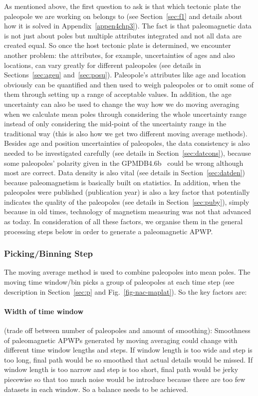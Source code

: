 As mentioned above, the first question to ask is that which tectonic plate the
paleopole we are working on belongs to (see Section~\ref{sec:f1} and details
about how it is solved in Appendix~\ref{appen4chp3}). The fact is that
paleomagnetic data is not just about poles but multiple attributes integrated
and not all data are created equal. So once the host tectonic plate is
determined, we encounter another problem: the attributes, for example,
uncertainties of ages and also locations, can vary greatly for different
paleopoles (see details in Sections~\ref{sec:ageu} and~\ref{sec:posu}).
Paleopole's attributes like age and location obviously can be
quantified and then used to weigh paleopoles or to omit some of them through
setting up a range of acceptable values. In addition, the age uncertainty can
also be used to change the way how we do moving averaging when we calculate mean
poles through considering the whole uncertainty range instead of only
considering the mid-point of the uncertainty range in the traditional way (this
is also how we get two different moving average methods). Besides age and
position uncertainties of paleopoles, the data consistency is also needed to be
investigated carefully (see details in Section~\ref{sec:datcons}), because some
paleopoles' polarity given in the GPMDB4.6b~\cite[updated in 2016 by the Ivar
Giaever Geomagnetic Laboratory team, in collaboration with Pisarevsky]{M96,P05}
could be wrong although most are correct. Data density is also vital (see
details in Section~\ref{sec:datden}) because paleomagnetism is basically built
on statistics. In addition, when the paleopoles were published (publication
year) is also a key factor that potentially indicates the quality of the
paleopoles (see details in Section~\ref{sec:puby}), simply because in old times,
technology of magnetism measuring was not that advanced as today. In
consideration of all these factors, we organise them in the general processing
steps below in order to generate a paleomagnetic APWP\@.

\subsubsection{Picking/Binning Step}

The moving average method is used to combine paleopoles into mean poles. The
moving time window/bin picks a group of paleopoles at each time step (see
description in Section~\ref{sec:p} and Fig.~\ref{fig-nac-maplat}). So the key
factors are:

\paragraph{Width of time window}
(trade off between number of paleopoles and amount of smoothing): Smoothness of
paleomagnetic APWPs generated by moving averaging could change with different
time window lengths and steps. If window length is too wide and step is too
long, final path would be so smoothed that actual details would be missed. If
window length is too narrow and step is too short, final path would be jerky
piecewise so that too much noise would be introduce because there are too few
datasets in each window. So a balance needs to be achieved.

